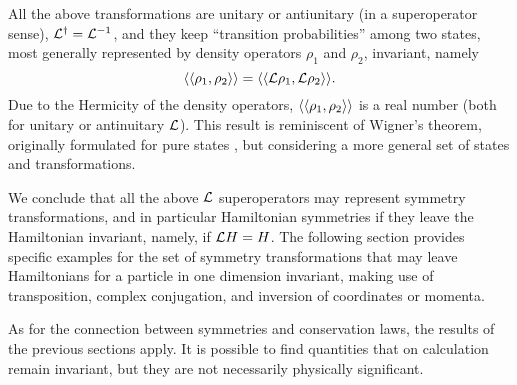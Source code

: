 All the above transformations are unitary or antiunitary (in a superoperator sense),
${\cal L}^\dagger= {\cal L}^{-1}$,
and they keep ``transition probabilities'' among
two states, most generally represented by density operators
$\rho_1$ and $\rho_2$, invariant, namely
%
\begin{equation}
\la\la \rho_1,\rho_2\ra\ra=\la\la {\cal L}\rho_1,  {\cal L} \rho_2\ra\ra.
\label{Wigner}
\end{equation}
%
Due to the Hermicity of the density operators, $\langle\langle \rho_1,\rho_2\rangle\rangle$ is a real number
(both for unitary or antinuitary ${\cal{L}}$). This result is reminiscent of Wigner's theorem, originally formulated
for pure states \cite{Wigner1959},
but considering a more general set of states and transformations.
%

We conclude that all the above ${\cal L}$ superoperators may represent symmetry transformations, and in particular
Hamiltonian symmetries if they leave the Hamiltonian invariant, namely,  if
${\cal L} H= H$. The following section provides specific examples for the set of symmetry transformations
that may leave Hamiltonians for a particle in one dimension invariant,
making use of transposition, complex conjugation, and inversion of
coordinates or momenta.

As for the connection between symmetries and conservation laws, the results of the previous sections apply.
It is possible
to find quantities that on calculation remain invariant, but they are not necessarily physically significant.

%
%
%
%
